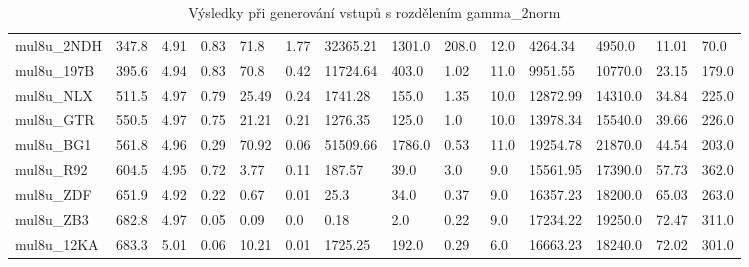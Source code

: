 \begin{landscape}
\begin{table}[!ht]
{\begin{tabular}{|l|l|l|l|l|l|l|l|l|l|l|l|l|l|}
        mul8u\_2NDH & 347.8 & 4.91 & 0.83 & 71.8 & 1.77 & 32365.21 & 1301.0 & 208.0 & 12.0 & 4264.34 & 4950.0 & 11.01 & 70.0 \\ 
        mul8u\_197B & 395.6 & 4.94 & 0.83 & 70.8 & 0.42 & 11724.64 & 403.0 & 1.02 & 11.0 & 9951.55 & 10770.0 & 23.15 & 179.0 \\ 
        mul8u\_NLX & 511.5 & 4.97 & 0.79 & 25.49 & 0.24 & 1741.28 & 155.0 & 1.35 & 10.0 & 12872.99 & 14310.0 & 34.84 & 225.0 \\ 
        mul8u\_GTR & 550.5 & 4.97 & 0.75 & 21.21 & 0.21 & 1276.35 & 125.0 & 1.0 & 10.0 & 13978.34 & 15540.0 & 39.66 & 226.0 \\ 
        mul8u\_BG1 & 561.8 & 4.96 & 0.29 & 70.92 & 0.06 & 51509.66 & 1786.0 & 0.53 & 11.0 & 19254.78 & 21870.0 & 44.54 & 203.0 \\ 
        mul8u\_R92 & 604.5 & 4.95 & 0.72 & 3.77 & 0.11 & 187.57 & 39.0 & 3.0 & 9.0 & 15561.95 & 17390.0 & 57.73 & 362.0 \\ 
        mul8u\_ZDF & 651.9 & 4.92 & 0.22 & 0.67 & 0.01 & 25.3 & 34.0 & 0.37 & 9.0 & 16357.23 & 18200.0 & 65.03 & 263.0 \\ 
        mul8u\_ZB3 & 682.8 & 4.97 & 0.05 & 0.09 & 0.0 & 0.18 & 2.0 & 0.22 & 9.0 & 17234.22 & 19250.0 & 72.47 & 311.0 \\ 
        mul8u\_12KA & 683.3 & 5.01 & 0.06 & 10.21 & 0.01 & 1725.25 & 192.0 & 0.29 & 6.0 & 16663.23 & 18240.0 & 72.02 & 301.0 \\ 
    \end{tabular}}
    \caption{Výsledky při generování vstupů s rozdělením gamma\_2norm}
    \label{gamma_2norm}
\end{table}


\end{landscape}
